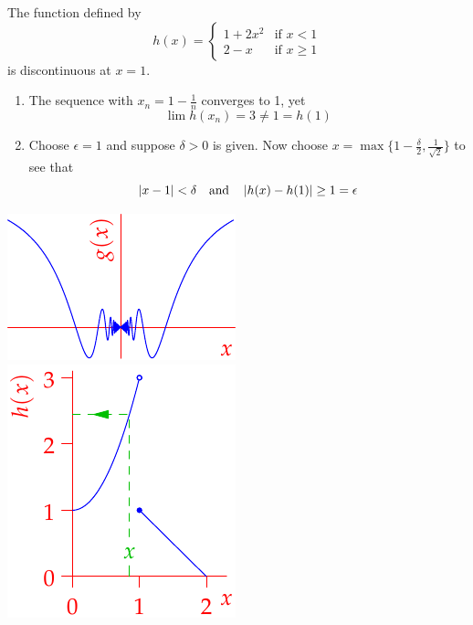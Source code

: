 \begin{examples}{}{}
\begin{enumerate}
\begin{minipage}[t]{0.70\linewidth}
	  	\item The function defined by
	  	\[
	  		h(x)=
	  		\begin{cases}
	  		1+2x^2&\text{if }x<1\\
	  		2-x&\text{if }x\ge 1
	  		\end{cases}
	  	\]
	  	is discontinuous at $x=1$.
	  	\begin{enumerate}
	  		\item The sequence with $x_n=1-\frac 1n$ converges to 1, yet
				\[
					\lim h(x_n)=3\neq 1=h(1)
				\]
	   		\item Choose $\epsilon=1$ and suppose $\delta>0$ is given. Now choose $x=\max\{1-\frac\delta 2,\frac 1{\sqrt 2}\}$ to see that
				\[
					\left| x-1\right|<\delta
					\quad\text{and}\quad 
					\left| h(x)-h(1)\right|\ge 1=\epsilon
				\]
			\end{enumerate}
		\end{minipage}
		\hfill
		\begin{minipage}[t]{0.29\linewidth}\vspace{0pt}
			\flushright\includegraphics{cont-ex1}\bigbreak
			\includegraphics{cont-ex2}
		\end{minipage}
	
	
		

\end{enumerate}
\end{examples}
